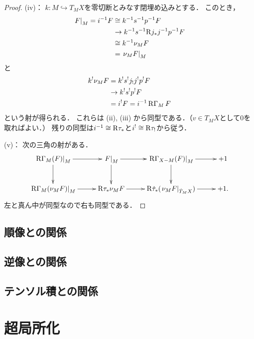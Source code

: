 \begin{proof}
    (iv)：
    \(k\colon M\hookrightarrow T_{M}X\)を零切断とみなす閉埋め込みとする．
    このとき，\begin{align*}
        \mres[F]{M}
        =i^{-1}F
        &\cong k^{-1}s^{-1}p^{-1}F\\
        &\to k^{-1}s^{-1}\Rder{j}_{\ast}j^{-1}p^{-1}F\\
        &\cong k^{-1}\nu_{M}F\\
        &=\mres[\nu_{M}F]{M}
    \end{align*}
    と\begin{align*}
        k^{!}\nu_{M}F
        &= k^{!}s^{!}j_{!}j^{!}p^{!}F\\
        &\to k^{!}s^{!}p^{!}F\\
        &= i^{!}F=i^{-1}\RG_{M}F
    \end{align*}
    という射が得られる．
    これらは (ii), (iii) から同型である．（\(v\in T_{M}X\)として\(0\)を取ればよい．）
    残りの同型は\(i^{-1}\cong \Rder{\tau}_{\ast}\)と\(i^{!}\cong \Rder{\tau}_{!}\)から従う．

    (v)：
    次の三角の射がある．
    \[    
        \vcenter{\xymatrix@C=26pt@R=26pt{
        \mres[\RG_{M}(F)]{M}    
        \ar[d]
        \ar[r]
        &
        \mres[F]{M}    
        \ar[r]
        \ar[d]
        &
        \mres[\RG_{X-M}(F)]{M}    
        \ar[r]
        \ar[d]
        &
        +1
        \\
        \mres[\RG_{M}(\nu_{M}F)]{M}    
        \ar[r]
        &
        \Rder{\tau_{\ast}}\nu_{M}F    
        \ar[r]
        &
        \Rder{\dot{\tau}}_{\ast}(\mres[\nu_{M}F]{\dot{T}_{M}X})    
        \ar[r]
        &
        +1.
      }}
    \]
    左と真ん中が同型なので右も同型である．
\end{proof}

\subsection*{順像との関係}
\subsection*{逆像との関係}
\subsection*{テンソル積との関係}

\section{超局所化}

